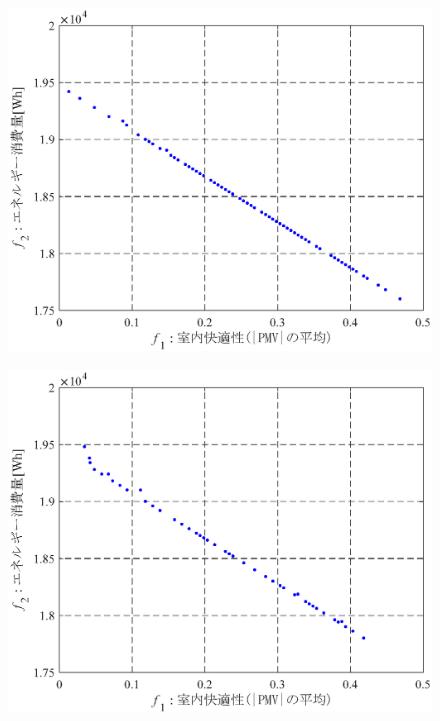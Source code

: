 \begin{figure}[htbp]
  \begin{center}
    \begin{minipage}{0.6\textwidth}
      \begin{center}
        \includegraphics[width=1.0\textwidth,keepaspectratio=true]{fig/math_result_pareto_eps1.eps}\\
      \end{center}
    \end{minipage}
    \begin{minipage}{0.6\textwidth}
      \begin{center}
        \includegraphics[width=1.0\textwidth,keepaspectratio=true]{fig/math_result_pareto_eps2.eps}\\

\end{center}
\end{minipage}
\end{center}
\end{figure}
